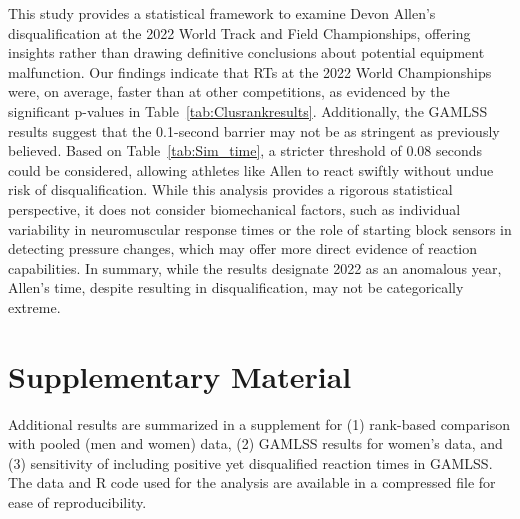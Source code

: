 \documentclass[12pt, letterpaper]{article}
\begin{document}
This study provides a statistical framework to examine Devon Allen’s
disqualification at the 2022 World Track and Field Championships,
offering insights rather than drawing definitive conclusions about
potential equipment malfunction. Our findings indicate that RTs
 at the 2022 World Championships were, on average, faster than at other
competitions, as evidenced by the significant p-values in
Table~\ref{tab:Clusrankresults}. Additionally, the GAMLSS results
suggest that the 0.1-second barrier may not be as stringent as
previously believed. Based on Table~\ref{tab:Sim_time}, a stricter
threshold of 0.08 seconds could be considered, allowing athletes like
Allen to react swiftly without undue risk of disqualification. While
this analysis provides a rigorous statistical perspective, it does not
consider biomechanical factors, such as individual variability in
neuromuscular response times or the role of starting block sensors in
detecting pressure changes, which may offer more direct evidence of
reaction capabilities. In summary, while the results designate 2022 as
an anomalous year, Allen’s time, despite resulting in
disqualification, may not be categorically extreme.


\section*{Supplementary Material}
Additional results are summarized in a supplement for (1) rank-based
comparison with pooled (men and women) data, (2) GAMLSS results
for women's data, and (3) sensitivity of including positive yet disqualified
reaction times in GAMLSS.
The data and R code used for the analysis are available in a compressed file for
ease of reproducibility.



\end{document}
